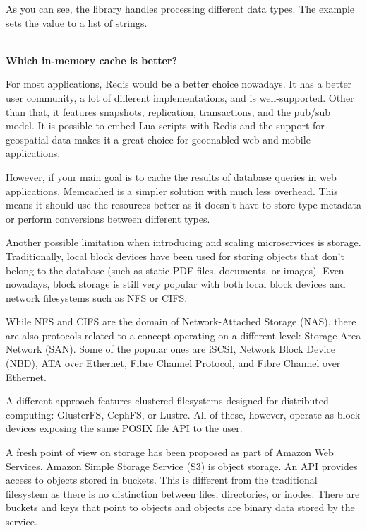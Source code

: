 As you can see, the library handles processing different data types. The example sets the value to a list of strings.

\hspace*{\fill} \\ %
\noindent
\textbf{Which in-memory cache is better?}

For most applications, Redis would be a better choice nowadays. It has a better user community, a lot of different implementations, and is well-supported. Other than that, it features snapshots, replication, transactions, and the pub/sub model. It is possible to embed Lua scripts with Redis and the support for geospatial data makes it a great choice for geoenabled web and mobile applications.

However, if your main goal is to cache the results of database queries in web applications, Memcached is a simpler solution with much less overhead. This means it should use the resources better as it doesn't have to store type metadata or perform conversions between different types.


Another possible limitation when introducing and scaling microservices is storage. Traditionally, local block devices have been used for storing objects that don't belong to the database (such as static PDF files, documents, or images). Even nowadays, block storage is still very popular with both local block devices and network filesystems such as NFS or CIFS.

While NFS and CIFS are the domain of Network-Attached Storage (NAS), there are also  protocols related to a concept operating on a different level: Storage Area Network (SAN). Some of the popular ones are iSCSI, Network Block Device (NBD), ATA over Ethernet, Fibre Channel Protocol, and Fibre Channel over Ethernet.

A different approach features clustered filesystems designed for distributed computing: GlusterFS, CephFS, or Lustre. All of these, however, operate as block devices exposing the same POSIX file API to the user.

A fresh point of view on storage has been proposed as part of Amazon Web Services. Amazon Simple Storage Service (S3) is object storage. An API provides access to objects stored in buckets. This is different from the traditional filesystem as there is no distinction between files, directories, or inodes. There are buckets and keys that point to objects and objects are binary data stored by the service.

